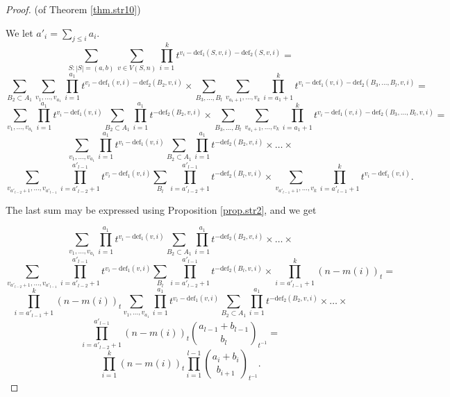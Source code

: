\documentclass{amsart}
\theoremstyle{plain}
\theoremstyle{definition}
\theoremstyle{remark}
\def\defect{\mathrm{def}}
\begin{document}
\begin{proof}(of Theorem \ref{thm.str10})

We let $a'_i= \sum_{j\leq i}a_i$.
$$
 \sum_{S: |S|=(a,b)} \sum_{v\in V(S,n)}
\prod_{i=1}^k t^{v_i-\defect_1(S,v,i)-\defect_2(S,v,i)}=
$$
$$
\sum_{B_2\subset A_1}\sum_{v_1,\dots, v_{a_1}}
\prod_{i=1}^{a_1} t^{v_i-\defect_1(v,i)-\defect_2(B_2,v,i)}\times
\sum_{B_3, \dots, B_l}\sum_{v_{a_1+1},\dots, v_k}
\prod_{i=a_1+1}^k t^{v_i-\defect_1(v,i)-\defect_2(B_3,\dots, B_l,v,i)}=
$$
$$
\sum_{v_1,\dots, v_{a_1}}\prod_{i=1}^{a_1} t^{v_i-\defect_1(v,i)}
\sum_{B_2\subset A_1}\prod_{i=1}^{a_1} t^{-\defect_2(B_2,v,i)}\times
\sum_{B_3, \dots, B_l}\sum_{v_{a_1+1},\dots, v_k}
\prod_{i=a_1+1}^{k} t^{v_i-\defect_1(v,i)-\defect_2(B_3,\dots, B_l,v,i)}=
$$
$$
\sum_{v_1,\dots, v_{a_1}}\prod_{i=1}^{a_1} t^{v_i-\defect_1(v,i)}
\sum_{B_2\subset A_1}\prod_{i=1}^{a_1} t^{-\defect_2(B_2,v,i)}\times
\dots \times
$$
$$
\sum_{v_{a'_{l-2}+1},\dots, v_{a'_{l-1}}}\prod_{i=a'_{l-2}+1}^{a'_{l-1}} 
t^{v_i-\defect_1(v,i)}
\sum_{B_l}\prod_{i=a'_{l-2}+1}^{a'_{l-1}}t^{-\defect_2(B_l,v,i)}\times
\sum_{v_{a'_{l-1}+1},\dots, v_k}
\prod_{i=a'_{l-1}+1}^k t^{v_i-\defect_1(v,i)}.
$$

The last sum may be expressed using Proposition \ref{prop.str2}, and we get

$$
\sum_{v_1,\dots, v_{a_1}}\prod_{i=1}^{a_1} t^{v_i-\defect_1(v,i)}
\sum_{B_2\subset A_1}\prod_{i=1}^{a_1} t^{-\defect_2(B_2,v,i)}\times
\dots \times
$$
$$
\sum_{v_{a'_{l-2}+1},\dots, v_{a'_{l-1}}}\prod_{i=a'_{l-2}+1}^{a'_{l-1}} 
t^{v_i-\defect_1(v,i)}
\sum_{B_l}\prod_{i=a'_{l-2}+1}^{a'_{l-1}}t^{-\defect_2(B_l,v,i)}\times
\prod_{i=a'_{l-1}+1}^k(n-m(i))_t=
$$
$$
\prod_{i=a'_{l-1}+1}^k(n-m(i))_t
\sum_{v_1,\dots, v_{a_1}}\prod_{i=1}^{a_1} t^{v_i-\defect_1(v,i)}
\sum_{B_2\subset A_1}\prod_{i=1}^{a_1} t^{-\defect_2(B_2,v,i)}\times
\dots \times
$$
$$
\prod_{i=a'_{l-2}+1}^{a'_{l-1}} (n-m(i))_t 
\binom{a_{l-1}+b_{l-1}}{b_l}_{t^{-1}}=
$$
$$
 \prod_{i=1}^k(n-m(i))_t\prod_{i=1}^{l-1} \binom{a_i+b_i}{b_{i+1}}_{t^{-1}}.
$$
\end{proof}
\end{document}
